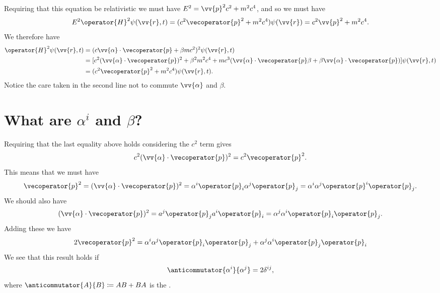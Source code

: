 \documentclass[fleqn]{NotesClass}
\newcommand*{\hamiltonian}{H}
\begin{document}
    Requiring that this equation be relativistic we must have \(E^2 = \vv{p}^2c^2 + m^2c^4\), and so we must have
    \begin{equation}
        E^2  \operator{\hamiltonian}^2\psi(\vv{r}, t) = (c^2\vecoperator{p}^2 + m^2c^4)\psi(\vv{r}) = c^2\vv{p}^2 + m^2c^4.
    \end{equation}
    We therefore have
    \begin{align}
        \operator{\hamiltonian}^2\psi(\vv{r}, t) &= (c\vv{\alpha} \cdot \vecoperator{p} + \beta mc^2)^2 \psi(\vv{r}, t)\\
        &= [c^2(\vv{\alpha} \cdot \vecoperator{p})^2 + \beta^2m^2c^4 + mc^3(\vv{\alpha}\cdot\vecoperator{p}\beta + \beta\vv{\alpha}\cdot\vecoperator{p})] \psi(\vv{r}, t)\\
        &= (c^2\vecoperator{p}^2 + m^2c^4)\psi(\vv{r}, t).
    \end{align}
    Notice the care taken in the second line not to commute \(\vv{\alpha}\) and \(\beta\).
    
    \section{What are \(\alpha^i\) and \(\beta\)?}
    Requiring that the last equality above holds considering the \(c^2\) term gives
    \begin{equation}
        c^2(\vv{\alpha} \cdot \vecoperator{p})^2 = c^2\vecoperator{p}^2.
    \end{equation}
    This means that we must have
    \begin{equation}
        \vecoperator{p}^2 = (\vv{\alpha} \cdot \vecoperator{p})^2 = \alpha^i\operator{p}_i\alpha^j\operator{p}_j = \alpha^i\alpha^j\operator{p}^i\operator{p}_j.
    \end{equation}
    We should also have
    \begin{equation}
        (\vv{\alpha} \cdot \vecoperator{p})^2 = a^j\operator{p}_ja^i\operator{p}_i = \alpha^j\alpha^i\operator{p}_i\operator{p}_j.
    \end{equation}
    Adding these we have
    \begin{equation}
        2\vecoperator{p}^2 = \alpha^i\alpha^j\operator{p}_i\operator{p}_j + \alpha^j\alpha^i\operator{p}_j\operator{p}_i
    \end{equation}
    We see that this result holds if
    \begin{equation}
        \anticommutator{\alpha^i}{\alpha^j} = 2\delta^{ij},
    \end{equation}
    where \(\anticommutator{A}{B} \coloneqq AB + BA\) is the .
    
\end{document}
